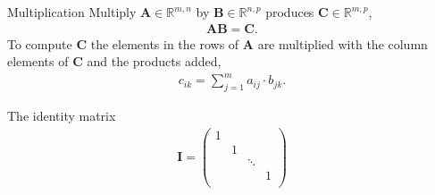 \documentclass[notes]{beamer}
\begin{document}
    \begin{frame}{Multiplication}
      Multiply $\mathbf{A} \in \mathbb{R}^{m,n}$ by $\mathbf{B} \in \mathbb{R}^{n,p}$ produces $\mathbf{C} \in \mathbb{R}^{m,p}$,
      \begin{align}
      \mathbf{A} \mathbf{B} = \mathbf{C}. 
      \end{align}
      To compute $\mathbf{C}$ the elements in the rows of $\mathbf{A}$ are multiplied with the column elements of $\mathbf{C}$ and the products added,
      \begin{align}
         c_{ik} = \sum_{j=1}^{m} a_{ij} \cdot b_{jk}.
      \end{align}
    \end{frame}

    \begin{frame}{The identity matrix}
      \begin{align}
        \mathbf{I} = \begin{pmatrix}
          1 & & & \\
            &1& & \\
            & & \ddots &\\
            & & &1\\
        \end{pmatrix}
      \end{align}
    \end{frame}
\end{document}
